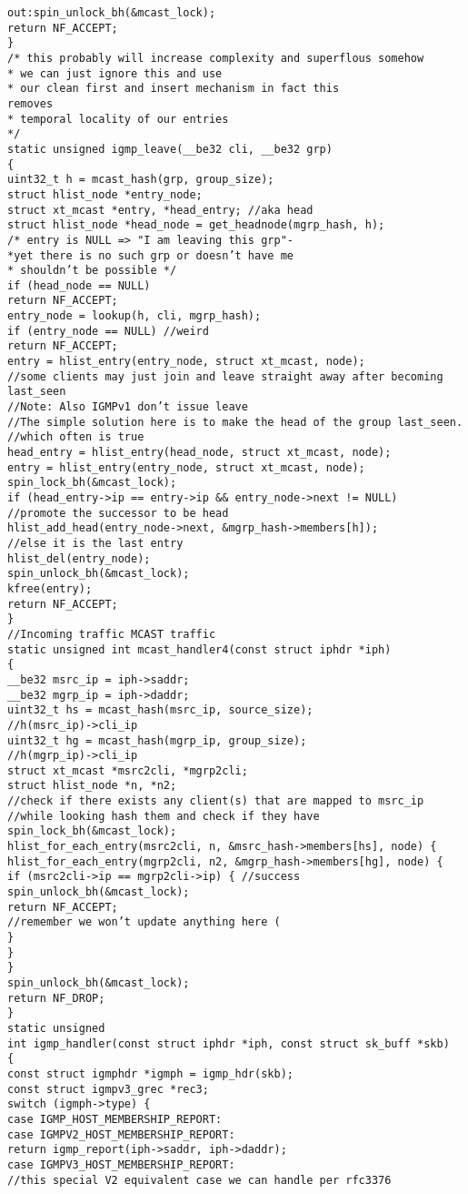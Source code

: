 \begin{verbatim}
out:spin_unlock_bh(&mcast_lock);
return NF_ACCEPT;
}
/* this probably will increase complexity and superflous somehow
* we can just ignore this and use
* our clean first and insert mechanism in fact this
removes
* temporal locality of our entries
*/
static unsigned igmp_leave(__be32 cli, __be32 grp)
{
uint32_t h = mcast_hash(grp, group_size);
struct hlist_node *entry_node;
struct xt_mcast *entry, *head_entry; //aka head
struct hlist_node *head_node = get_headnode(mgrp_hash, h);
/* entry is NULL => "I am leaving this grp"-
*yet there is no such grp or doesn’t have me
* shouldn’t be possible */
if (head_node == NULL)
return NF_ACCEPT;
entry_node = lookup(h, cli, mgrp_hash);
if (entry_node == NULL) //weird
return NF_ACCEPT;
entry = hlist_entry(entry_node, struct xt_mcast, node);
//some clients may just join and leave straight away after becoming last_seen
//Note: Also IGMPv1 don’t issue leave
//The simple solution here is to make the head of the group last_seen.
//which often is true
head_entry = hlist_entry(head_node, struct xt_mcast, node);
entry = hlist_entry(entry_node, struct xt_mcast, node);
spin_lock_bh(&mcast_lock);
if (head_entry->ip == entry->ip && entry_node->next != NULL)
//promote the successor to be head
hlist_add_head(entry_node->next, &mgrp_hash->members[h]);
//else it is the last entry
hlist_del(entry_node);
spin_unlock_bh(&mcast_lock);
kfree(entry);
return NF_ACCEPT;
}
//Incoming traffic MCAST traffic
static unsigned int mcast_handler4(const struct iphdr *iph)
{
__be32 msrc_ip = iph->saddr;
__be32 mgrp_ip = iph->daddr;
uint32_t hs = mcast_hash(msrc_ip, source_size);
//h(msrc_ip)->cli_ip
uint32_t hg = mcast_hash(mgrp_ip, group_size);
//h(mgrp_ip)->cli_ip
struct xt_mcast *msrc2cli, *mgrp2cli;
struct hlist_node *n, *n2;
//check if there exists any client(s) that are mapped to msrc_ip
//while looking hash them and check if they have
spin_lock_bh(&mcast_lock);
hlist_for_each_entry(msrc2cli, n, &msrc_hash->members[hs], node) {
hlist_for_each_entry(mgrp2cli, n2, &mgrp_hash->members[hg], node) {
if (msrc2cli->ip == mgrp2cli->ip) { //success
spin_unlock_bh(&mcast_lock);
return NF_ACCEPT;
//remember we won’t update anything here (
}
}
}
spin_unlock_bh(&mcast_lock);
return NF_DROP;
}
static unsigned
int igmp_handler(const struct iphdr *iph, const struct sk_buff *skb)
{
const struct igmphdr *igmph = igmp_hdr(skb);
const struct igmpv3_grec *rec3;
switch (igmph->type) {
case IGMP_HOST_MEMBERSHIP_REPORT:
case IGMPV2_HOST_MEMBERSHIP_REPORT:
return igmp_report(iph->saddr, iph->daddr);
case IGMPV3_HOST_MEMBERSHIP_REPORT:
//this special V2 equivalent case we can handle per rfc3376

\end{verbatim}
